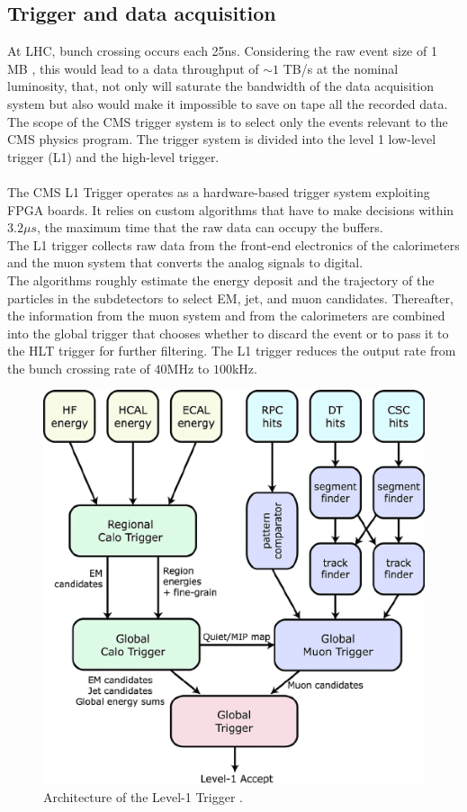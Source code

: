\subsection{Trigger and data acquisition}
At LHC, bunch crossing occurs each 25ns. Considering the raw event size of 1 MB \cite{Franzoni2016DatasetAnalyses}, this would lead to a data throughput of  $\sim 1$ TB/s at the nominal luminosity, that, not only will saturate the bandwidth of the data acquisition system but also would make it impossible to save on tape all the recorded data.\\
The scope of the CMS trigger system is to select only the events relevant to the CMS physics program.
The trigger system is divided into the level 1 low-level trigger (L1) and the high-level trigger.\\
\\
The CMS L1 Trigger \cite{Musenich2000CMSSystems} operates as a hardware-based trigger system exploiting FPGA boards. It relies on custom algorithms that have to make decisions within $3.2 \mu s$, the maximum time that the raw data can occupy the buffers.\\
The L1 trigger collects raw data from the front-end electronics of the calorimeters and the muon system that converts the analog signals to digital.\\
The algorithms roughly estimate the energy deposit and the trajectory of the particles in the subdetectors to select EM, jet, and muon candidates. Thereafter, the information from the muon system and from the calorimeters are combined into the global trigger that chooses whether to discard the event or to pass it to the HLT trigger for further filtering.
The L1 trigger reduces the output rate from the bunch crossing rate of $40$MHz to $100$kHz.
\\
\begin{figure}[h!]
    \centering
    \includegraphics[width=0.6\linewidth]{fig/chap03-cms/L1_upscayl_2x_remacri_upscayl_2x_remacri.png}
    \caption{Architecture of the Level-1 Trigger \cite{Brooke2003HardwareTrigger}.}
    \label{fig:l1}
\end{figure}
